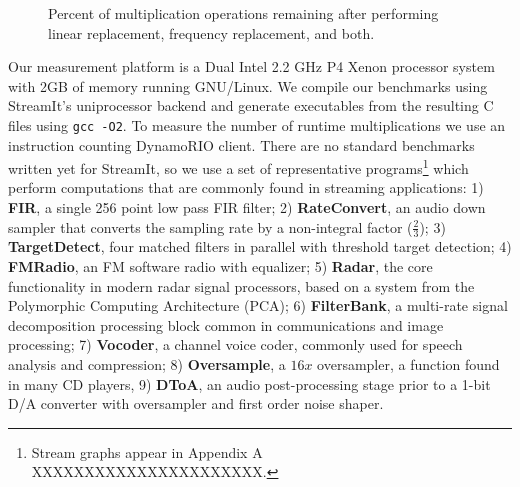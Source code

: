 \begin{figure}[t]
\center
\epsfxsize=3.2in
\vspace{-6pt}
\caption{Percent of multiplication operations remaining after performing linear replacement, frequency replacement, and both.}
\label{fig:linear-freq-both}
\vspace{-12pt}
\end{figure}


Our measurement platform is a Dual Intel 2.2 GHz P4 Xenon processor system 
with 2GB of memory running GNU/Linux. We compile our benchmarks using StreamIt's uniprocessor backend
and generate executables from the resulting C files using {\tt gcc -O2}.
To measure the number of runtime multiplications we use an instruction counting 
DynamoRIO\cite{dynamo99} client.
There are no standard benchmarks written yet for StreamIt, so we use
a set of representative programs\footnote{Stream graphs appear in Appendix A XXXXXXXXXXXXXXXXXXXXXX.}
which perform computations that are commonly found in streaming applications:
1) {\bf FIR}, a single 256 point low pass FIR filter; 
2) {\bf RateConvert}, an audio down sampler that converts the 
sampling rate by a non-integral factor ($\frac{2}{3}$); 
3) {\bf TargetDetect}, four matched filters in parallel with threshold target detection; 
4) {\bf FMRadio}, an FM software radio with equalizer;
5) {\bf Radar}, the core functionality in modern radar signal processors, based on a system from the Polymorphic Computing Architecture (PCA);
6) {\bf FilterBank}, a multi-rate signal decomposition 
processing block common in communications and image processing;
7) {\bf Vocoder}, a channel voice coder, commonly used for speech analysis and compression;
8) {\bf Oversample}, a $16x$ oversampler, a function found in many CD players,
9) {\bf DToA}, an audio post-processing stage prior to a 1-bit D/A converter 
with oversampler and first order noise shaper.

